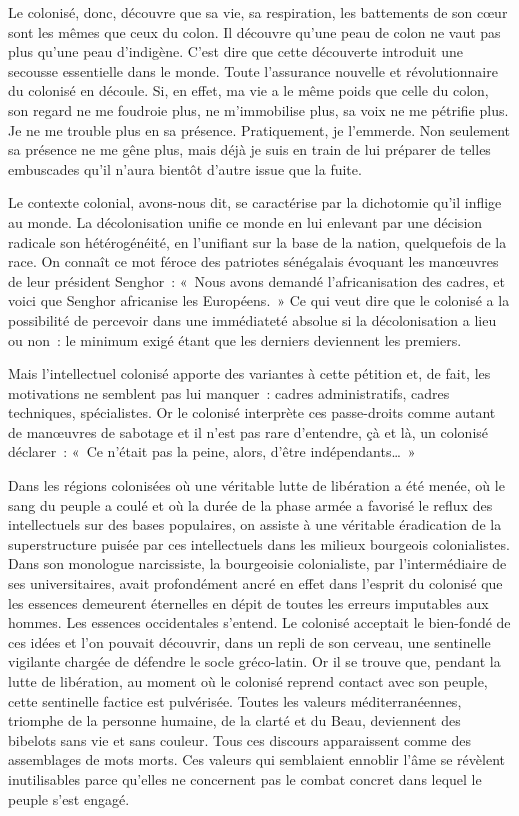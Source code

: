 \documentclass[french,twoside]{book} %
\begin{document}
\bigbreak
\noindent Le colonisé, donc, découvre que sa vie, sa respiration, les battements de son cœur sont les mêmes que ceux du colon. Il découvre qu’une peau de colon ne vaut pas plus qu’une peau d’indigène. C’est dire que cette découverte introduit une secousse essentielle dans le monde. Toute l’assurance nouvelle et révolutionnaire du colonisé en découle. Si, en effet, ma vie a le même poids que celle du colon, son regard ne me foudroie plus, ne m’immobilise plus, sa voix ne me pétrifie plus. Je ne me trouble plus en sa présence. Pratiquement, je l’emmerde. Non seulement sa présence ne me gêne plus, mais déjà je suis en train de lui préparer de telles embuscades qu’il n’aura bientôt d’autre issue que la fuite.\par
Le contexte colonial, avons-nous dit, se caractérise par la dichotomie qu’il inflige au monde. La décolonisation unifie ce monde en lui enlevant par une décision radicale son hétérogénéité, en l’unifiant sur la base de la nation, quelquefois de la race. On connaît ce mot féroce des patriotes sénégalais évoquant les manœuvres de leur président Senghor : « Nous avons demandé l’africanisation des cadres, et voici que Senghor africanise les Européens. » Ce qui veut dire que le colonisé a la possibilité de percevoir dans une immédiateté absolue si la décolonisation a lieu ou non : le minimum exigé étant que les derniers deviennent les premiers.\par
Mais l’intellectuel colonisé apporte des variantes à cette pétition et, de fait, les motivations ne semblent pas lui manquer : cadres administratifs, cadres techniques, spécialistes. Or le colonisé interprète ces passe-droits comme autant de manœuvres de sabotage et il n’est pas rare d’entendre, çà et là, un colonisé déclarer : « Ce n’était pas la peine, alors, d’être indépendants… »\par
 Dans les régions colonisées où une véritable lutte de libération a été menée, où le sang du peuple a coulé et où la durée de la phase armée a favorisé le reflux des intellectuels sur des bases populaires, on assiste à une véritable éradication de la superstructure puisée par ces intellectuels dans les milieux bourgeois colonialistes. Dans son monologue narcissiste, la bourgeoisie colonialiste, par l’intermédiaire de ses universitaires, avait profondément ancré en effet dans l’esprit du colonisé que les essences demeurent éternelles en dépit de toutes les erreurs imputables aux hommes. Les essences occidentales s’entend. Le colonisé acceptait le bien-fondé de ces idées et l’on pouvait découvrir, dans un repli de son cerveau, une sentinelle vigilante chargée de défendre le socle gréco-latin. Or il se trouve que, pendant la lutte de libération, au moment où le colonisé reprend contact avec son peuple, cette sentinelle factice est pulvérisée. Toutes les valeurs méditerranéennes, triomphe de la personne humaine, de la clarté et du Beau, deviennent des bibelots sans vie et sans couleur. Tous ces discours apparaissent comme des assemblages de mots morts. Ces valeurs qui semblaient ennoblir l’âme se révèlent inutilisables parce qu’elles ne concernent pas le combat concret dans lequel le peuple s’est engagé.\par
\end{document}
